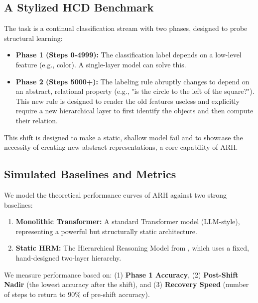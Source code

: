 \documentclass{article}
\begin{document}
\subsection{A Stylized HCD Benchmark}
The task is a continual classification stream with two phases, designed to probe structural learning:
\begin{itemize}
    \item \textbf{Phase 1 (Steps 0-4999):} The classification label depends on a low-level feature (e.g., color). A single-layer model can solve this.
    \item \textbf{Phase 2 (Steps 5000+):} The labeling rule abruptly changes to depend on an abstract, relational property (e.g., "is the circle to the left of the square?"). This new rule is designed to render the old features useless and explicitly require a new hierarchical layer to first identify the objects and then compute their relation.
\end{itemize}
This shift is designed to make a static, shallow model fail and to showcase the necessity of creating new abstract representations, a core capability of ARH.

\subsection{Simulated Baselines and Metrics}
We model the theoretical performance curves of ARH against two strong baselines:
\begin{enumerate}
    \item \textbf{Monolithic Transformer:} A standard Transformer model (LLM-style), representing a powerful but structurally static architecture.
    \item \textbf{Static HRM:} The Hierarchical Reasoning Model from \citet{HRM2025}, which uses a fixed, hand-designed two-layer hierarchy.
\end{enumerate}
We measure performance based on: (1) \textbf{Phase 1 Accuracy}, (2) \textbf{Post-Shift Nadir} (the lowest accuracy after the shift), and (3) \textbf{Recovery Speed} (number of steps to return to 90\% of pre-shift accuracy).
\end{document}
